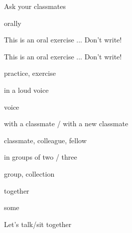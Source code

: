 \documentclass[avery5371,grid,frame]{flashcards}
\begin{document}
\cardfrontfoot{}
\begin{flashcard}{\LARGE Ask your classmates}
\LARGE {}
\end{flashcard}
\cardfrontfoot{}
\begin{flashcard}{\LARGE orally}
\LARGE {}
\end{flashcard}
\cardfrontfoot{}
\begin{flashcard}{\LARGE This is an oral exercise ... Don't write!}
\LARGE {}
\end{flashcard}
\cardfrontfoot{}
\begin{flashcard}{\LARGE This is an oral exercise ... Don't write!}
\LARGE {}
\end{flashcard}
\cardfrontfoot{}
\begin{flashcard}{\LARGE practice, exercise}
\LARGE {}
\end{flashcard}
\cardfrontfoot{}
\begin{flashcard}{\LARGE in a loud voice}
\LARGE {}
\end{flashcard}
\cardfrontfoot{}
\begin{flashcard}{\LARGE voice}
\LARGE {}
\end{flashcard}
\cardfrontfoot{}
\begin{flashcard}{\LARGE with a classmate / with a new classmate}
\LARGE {}
\end{flashcard}
\cardfrontfoot{}
\begin{flashcard}{\LARGE classmate, colleague, fellow}
\LARGE {}
\end{flashcard}
\cardfrontfoot{}
\begin{flashcard}{\LARGE in groups of two / three}
\LARGE {}
\end{flashcard}
\cardfrontfoot{}
\begin{flashcard}{\LARGE group, collection}
\LARGE {}
\end{flashcard}
\cardfrontfoot{}
\begin{flashcard}{\LARGE together}
\LARGE {}
\end{flashcard}
\cardfrontfoot{}
\begin{flashcard}{\LARGE some}
\LARGE {}
\end{flashcard}
\cardfrontfoot{}
\begin{flashcard}{\LARGE Let's talk/sit together}
\LARGE {}
\end{flashcard}
\end{document}
